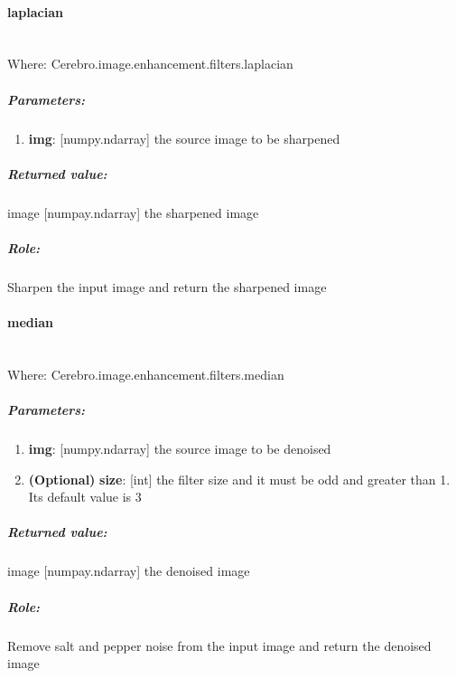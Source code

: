 \paragraph{laplacian} \mbox{} \\
Where: Cerebro.image.enhancement.filters.laplacian
\subparagraph{Parameters:}
\begin{changemargin}{0.5cm}{0cm}
\begin{enumerate} 
	\item \textbf{img}: [numpy.ndarray] the source image to be sharpened
\end{enumerate}
\end{changemargin}

\subparagraph{Returned value:}
\begin{changemargin}{1cm}{0cm}
	image [numpay.ndarray] the sharpened image
\end{changemargin}

\subparagraph{Role:}
\begin{changemargin}{1cm}{0cm}
	Sharpen the input image and return the sharpened image
\end{changemargin}


\paragraph{median} \mbox{} \\
Where: Cerebro.image.enhancement.filters.median
\subparagraph{Parameters:}
\begin{changemargin}{0.5cm}{0cm}
	\begin{enumerate}
		\item \textbf{img}: [numpy.ndarray] the source image to be denoised
		\item \textbf{(Optional)} \textbf{size}: [int] the filter size and it must be odd and greater than 1. Its default value is 3
	\end{enumerate}
\end{changemargin}

\subparagraph{Returned value:}
\begin{changemargin}{1cm}{0cm}
	image [numpay.ndarray] the denoised image
\end{changemargin}

\subparagraph{Role:}
\begin{changemargin}{1cm}{0cm}
 	Remove salt and pepper noise from the input image and return the denoised image
\end{changemargin}

